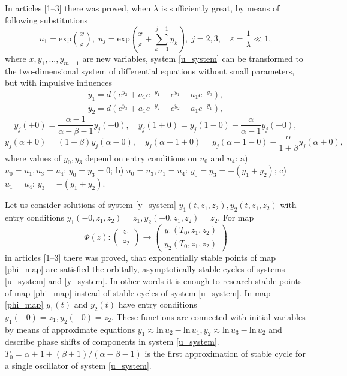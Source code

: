 \documentclass[12pt]{amsart}
\begin{document}
In articles [1--3] there was proved, when $ \lambda $ is sufficiently great, by means of following substitutions
$$ u_1 = \mbox{exp}\left(\frac{x}{\varepsilon}\right), \; u_j = \mbox{exp}\left(\frac{x}{\varepsilon} + \sum_{k=1}^{j-1}y_k\right), \; j= 2,3, \quad \varepsilon = \frac{1}{\lambda}\ll 1, $$
where $ x, y_1, ..., y_{m-1} $ are new variables, system \eqref{u_system} can be transformed to the two-dimensional system of differential equations without small parameters, but with impulsive influences 
\begin{equation}\label{y_system}
\begin{array}{l}
\dot{y_1} = d(e^{y_2} + a_1e^{-y_1} - e^{y_1} - a_1e^{-y_0}), \\
\dot{y_2} = d(e^{y_3} + a_1e^{-y_2} - e^{y_2} - a_1e^{-y_1}),
\end{array}
\end{equation}
$$ y_j(+0) = \frac{\alpha -1}{\alpha - \beta - 1}y_j(-0), \quad y_j(1+0) = y_j(1-0) - \frac{\alpha}{\alpha - 1}y_j(+0), $$
$$ y_j(\alpha + 0) = (1 + \beta)y_j(\alpha - 0), \quad y_j(\alpha + 1 + 0) = y_j(\alpha + 1 - 0) - \frac{\alpha}{1 + \beta}y_j(\alpha + 0),  $$
where values of $ y_0, y_3 $ depend on entry conditions on $ u_0 $ and $ u_4 $: a) $ u_0 = u_1, u_3 = u_4 $: $ y_0 = y_3 = 0 $; b) $ u_0 = u_3, u_1 = u_4 $: $ y_0 = y_3 = -(y_1 + y_2) $; c) $ u_1 = u_4 $: $ y_3 = -(y_1 + y_2) $.

Let us consider solutions of system \eqref{y_system} $ y_1(t, z_1, z_2), y_2(t, z_1, z_2) $ with entry conditions $ y_1(-0, z_1, z_2) = z_1, y_2(-0, z_1, z_2) = z_2 $. For map
\begin{equation}\label{phi_map}
	\Phi(z): \begin{pmatrix}
           z_1 \\
           z_2
          \end{pmatrix}
					\to
					\begin{pmatrix}
           y_1(T_0, z_1, z_2) \\
           y_2(T_0, z_1, z_2)
          \end{pmatrix}
\end{equation}
in articles [1--3] there was proved, that exponentially stable points of map \eqref{phi_map} are satisfied the orbitally, asymptotically stable cycles of systems \eqref{u_system} and \eqref{y_system}. In other words it is enough to research stable points of map \eqref{phi_map} instead of stable cycles of system \eqref{u_system}. In map \eqref{phi_map} $ y_1(t) $ and $ y_2(t) $ have entry conditions $ y_1(-0)=z_1, y_2(-0)=z_2. $ These functions are connected with initial variables by means of approximate equations $ y_1 \approx \mbox{ln}\,u_2 - \mbox{ln}\,u_1, y_2 \approx \mbox{ln}\,u_3 - \mbox{ln}\,u_2 $ and describe phase shifts of components in system \eqref{u_system}. $ T_0 = \alpha + 1 + (\beta+1)/(\alpha-\beta-1) $ is the first approximation of stable cycle for a single oscillator of system \eqref{u_system}.
\end{document}
